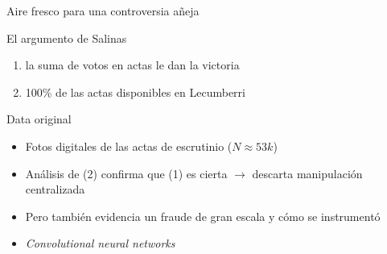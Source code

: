 \documentclass[bigger]{beamer}
\begin{document}
\begin{frame}[label={sec:org87db8ed}]{Aire fresco para una controversia añeja}
\begin{block}{El argumento de Salinas}
\begin{enumerate}
\item la suma de votos en actas le dan la victoria
\item 100\% de las actas disponibles en Lecumberri
\end{enumerate}
\bigskip \pause
\end{block}
\begin{block}{Data original}
\begin{itemize}
\item Fotos digitales de las actas de escrutinio (\(N \approx 53k\))
\item Análisis de (2) confirma que (1) es cierta \newline
\(\rightarrow\) descarta manipulación centralizada
\item Pero también evidencia un \alert{fraude de gran escala} y cómo se instrumentó
\item \emph{Convolutional neural networks}
\end{itemize}
\end{block}
\end{frame}
\end{document}
